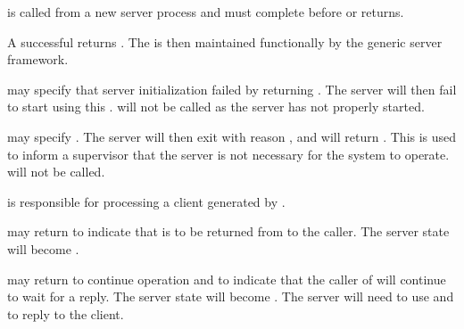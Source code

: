  is called from a new server process and
must complete before  or
 returns.

A successful  returns . The  is then maintained
functionally by the generic server framework.

 may specify that server initialization failed by
returning . The server will then fail to
start using this .  will not be called
as the server has not properly started.

 may specify . The server will then exit
with reason , and  will
return . This is used to inform a
supervisor that the server is not necessary
for the system to operate.  will not be called.

\begin{procedure}
\end{procedure}
\returns{}

\begin{argtbl}
\end{argtbl}

 is responsible for processing a client
 generated by .

 may return  to indicate that  is to
be returned from  to the caller. The server
state will become .

 may return  to continue operation and to indicate that the
caller of  will continue to wait for a
reply. The server state will become . The server will need
to use  and  to reply to the
client.

